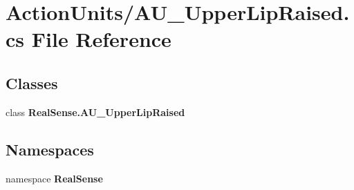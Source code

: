 \section{Action\+Units/\+A\+U\+\_\+\+Upper\+Lip\+Raised.cs File Reference}
\label{_a_u___upper_lip_raised_8cs}
\subsection*{Classes}
\begin{DoxyCompactItemize}
\item 
class \textbf{ Real\+Sense.\+A\+U\+\_\+\+Upper\+Lip\+Raised}
\end{DoxyCompactItemize}
\subsection*{Namespaces}
\begin{DoxyCompactItemize}
\item 
namespace \textbf{ Real\+Sense}
\end{DoxyCompactItemize}
